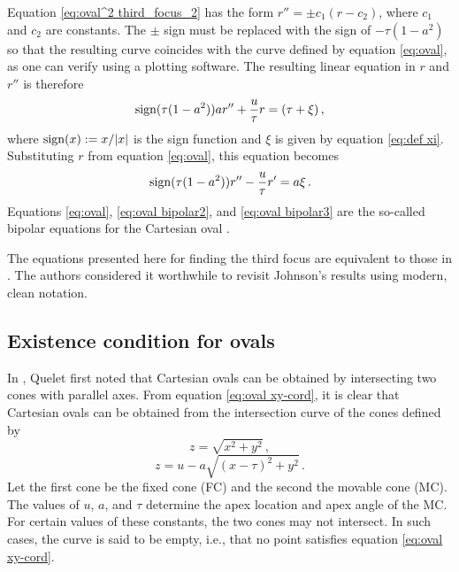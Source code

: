 \documentclass[12pt, ams, nofootinbib]{revtex4}
\def\be{\begin{equation}}
\def\ee{\end{equation}}
\def\sign{{\rm sign}}
\def\min{{\rm min}}
\theoremstyle{definition}
\begin{document}
Equation \ref{eq:oval^2 third_focus_2} has the form $r''=\pm c_1(r-c_2)$, where $c_1$ and $c_2$ are constants. The $\pm$ sign must be replaced with the sign of $-\tau(1-a^2)$ so that the resulting curve coincides with the curve defined by equation \ref{eq:oval}, as one can verify using a plotting software. The resulting linear equation in $r$ and $r''$ is therefore
\be
	\sign(\tau(1-a^2)) ar''+\frac{u}{\tau}r=(\tau+\xi)\,,\label{eq:oval bipolar2}
\ee
where $\sign(x):=x/|x|$ is the sign function and $\xi$ is given by equation \ref{eq:def xi}. Substituting $r$ from equation \ref{eq:oval}, this equation becomes
\be 
	\sign(\tau(1-a^2))r''-\frac{u}{\tau}r'=a\xi\,. \label{eq:oval bipolar3}
\ee
Equations \ref{eq:oval}, \ref{eq:oval bipolar2}, and \ref{eq:oval bipolar3} are the so-called bipolar equations for the Cartesian oval \cite{johnson1875bipolar}.  

The equations presented here for finding the third focus are equivalent to those in \cite{johnson1875bipolar}. The authors considered it worthwhile to revisit Johnson's results using modern, clean notation.


\subsection{Existence condition for ovals}

In \cite{quelet1829}, Quelet first noted that Cartesian ovals can be obtained by intersecting two cones with parallel axes. From equation \ref{eq:oval xy-cord}, it is clear that Cartesian ovals can be obtained from the intersection curve of the cones defined by
\be
	z=\sqrt{x^2+y^2}\,,
\ee
\be
	z=u-a\sqrt{(x-\tau)^2+y^2}\,.
\ee
Let the first cone be the fixed cone (FC) and the second the movable cone (MC). The values of $u$, $a$, and $\tau$ determine the apex location and apex angle of the MC. For certain values of these constants, the two cones may not intersect. In such cases, the curve is said to be empty, i.e., that no point satisfies equation \ref{eq:oval xy-cord}.
\end{document}
